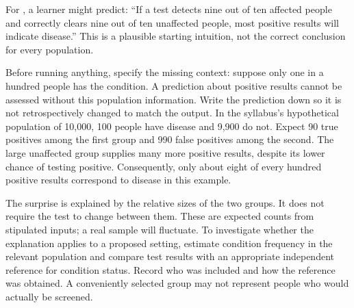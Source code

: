 \biomedicalanswer
{}
For , a learner might predict: ``If a test detects nine out of ten affected people and correctly clears nine out of ten unaffected people, most positive results will indicate disease.'' This is a plausible starting intuition, not the correct conclusion for every population.

Before running anything, specify the missing context: suppose only one in a hundred people has the condition. A prediction about positive results cannot be assessed without this population information. Write the prediction down so it is not retrospectively changed to match the output.
In the syllabus's hypothetical population of 10,000, 100 people have disease and 9,900 do not. Expect 90 true positives among the first group and 990 false positives among the second. The large unaffected group supplies many more positive results, despite its lower chance of testing positive. Consequently, only about eight of every hundred positive results correspond to disease in this example.

The surprise is explained by the relative sizes of the two groups. It does not require the test to change between them. These are expected counts from stipulated inputs; a real sample will fluctuate.
To investigate whether the explanation applies to a proposed setting, estimate condition frequency in the relevant population and compare test results with an appropriate independent reference for condition status. Record who was included and how the reference was obtained. A conveniently selected group may not represent people who would actually be screened.

